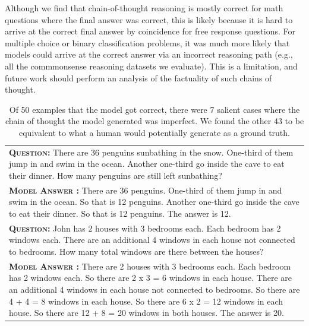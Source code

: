 \documentclass[]{article}
\theoremstyle{plain}
\theoremstyle{definition}
\theoremstyle{remark}
\begin{document}
Although we find that chain-of-thought reasoning is mostly correct for math questions where the final answer was correct, this is likely because it is hard to arrive at the correct final answer by coincidence for free response questions.
For multiple choice or binary classification problems, it was much more likely that models could arrive at the correct answer via an incorrect reasoning path (e.g., all the commmonsense reasoning datasets we evaluate). 
This is a limitation, and future work should perform an analysis of the factuality of such chains of thought.


\begingroup
\begin{table}[ht]
    \caption{
    Of 50 examples that the model got correct, there were 7 salient cases where the chain of thought the model generated was imperfect. We found the other 43 to be equivalent to what a human would potentially generate as a ground truth.
    }
    \centering
    \small
    \begin{tabular}{p{\linewidth}}
        \toprule
        \vspace{-2mm}
        \textbf{\textsc{Question:}} There are 36 penguins sunbathing in the snow. One-third of them jump in and swim in the ocean. Another one-third go inside the cave to eat their dinner. How many penguins are still left sunbathing? \\
        \vspace{-1mm}
        \textbf{\textsc{Model Answer \color{darkGreen}{(correct by chance)}:}} There are 36 penguins. One-third of them jump in and swim in the ocean. So that is 12 penguins. Another one-third go inside the cave to eat their dinner. So that is 12 penguins. The answer is 12. \\
        \midrule
        \vspace{-2mm}
        \textbf{\textsc{Question:}} John has 2 houses with 3 bedrooms each. Each bedroom has 2 windows each. There are an additional 4 windows in each house not connected to bedrooms. How many total windows are there between the houses? \\
        \vspace{-1mm}
        \textbf{\textsc{Model Answer \color{darkGreen}{(correct but underspecified statements)}:}} There are 2 houses with 3 bedrooms each. Each bedroom has 2 windows each. So there are 2 x 3 = 6 windows in each house. There are an additional 4 windows in each house not connected to bedrooms. {\color{blue} So there are 4 + 4 = 8 windows in each house. So there are 6 x 2 = 12 windows in each house.} So there are 12 + 8 = 20 windows in both houses. The answer is 20. \\

\end{tabular}
\end{table}
\end{document}
